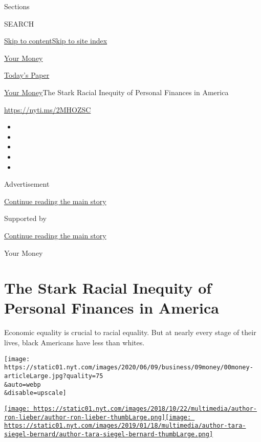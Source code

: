 Sections

SEARCH

\protect\hyperlink{site-content}{Skip to
content}\protect\hyperlink{site-index}{Skip to site index}

\href{https://www.nytimes.com/section/your-money}{Your Money}

\href{https://myaccount.nytimes.com/auth/login?response_type=cookie\&client_id=vi}{}

\href{https://www.nytimes.com/section/todayspaper}{Today's Paper}

\href{/section/your-money}{Your Money}\textbar{}The Stark Racial
Inequity of Personal Finances in America

\url{https://nyti.ms/2MHOZSC}

\begin{itemize}
\item
\item
\item
\item
\item
\end{itemize}

Advertisement

\protect\hyperlink{after-top}{Continue reading the main story}

Supported by

\protect\hyperlink{after-sponsor}{Continue reading the main story}

Your Money

\hypertarget{the-stark-racial-inequity-of-personal-finances-in-america}{%
\section{The Stark Racial Inequity of Personal Finances in
America}\label{the-stark-racial-inequity-of-personal-finances-in-america}}

Economic equality is crucial to racial equality. But at nearly every
stage of their lives, black Americans have less than whites.

\texttt{[image: https://static01.nyt.com/images/2020/06/09/business/09money/00money-articleLarge.jpg?quality=75\\\&auto=webp\\\&disable=upscale]}

\href{https://www.nytimes.com/by/ron-lieber}{\texttt{[image: https://static01.nyt.com/images/2018/10/22/multimedia/author-ron-lieber/author-ron-lieber-thumbLarge.png]}}\href{https://www.nytimes.com/by/tara-siegel-bernard}{\texttt{[image: https://static01.nyt.com/images/2019/01/18/multimedia/author-tara-siegel-bernard/author-tara-siegel-bernard-thumbLarge.png]}}

